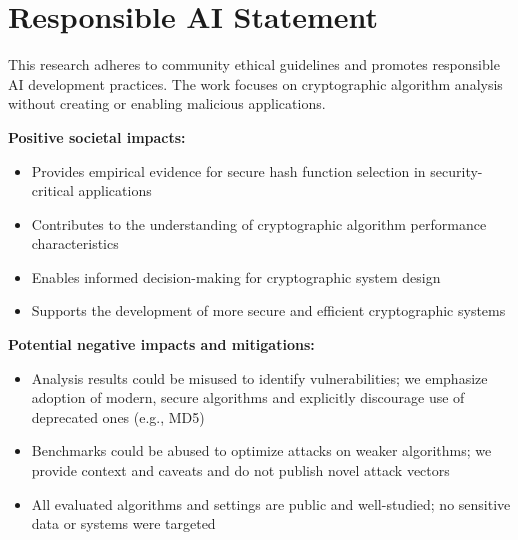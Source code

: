 
\providecommand{\answerYes}{Yes}
\providecommand{\answerNo}{No}
\providecommand{\answerNA}{N/A}

\providecommand{\involvementA}{Human-generated}
\providecommand{\involvementB}{Mostly human, assisted by AI}
\providecommand{\involvementC}{Mostly AI, assisted by human}
\providecommand{\involvementD}{AI-generated}

\section*{Responsible AI Statement}
This research adheres to community ethical guidelines and promotes responsible AI development practices. The work focuses on cryptographic algorithm analysis without creating or enabling malicious applications.

\textbf{Positive societal impacts:}
\begin{itemize}
  \item Provides empirical evidence for secure hash function selection in security-critical applications
  \item Contributes to the understanding of cryptographic algorithm performance characteristics
  \item Enables informed decision-making for cryptographic system design
  \item Supports the development of more secure and efficient cryptographic systems
\end{itemize}

\textbf{Potential negative impacts and mitigations:}
\begin{itemize}
  \item Analysis results could be misused to identify vulnerabilities; we emphasize adoption of modern, secure algorithms and explicitly discourage use of deprecated ones (e.g., MD5)
  \item Benchmarks could be abused to optimize attacks on weaker algorithms; we provide context and caveats and do not publish novel attack vectors
  \item All evaluated algorithms and settings are public and well-studied; no sensitive data or systems were targeted
\end{itemize}

